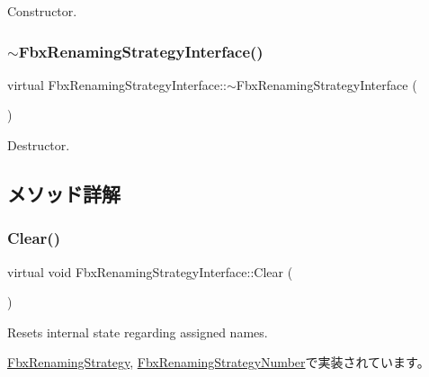 Constructor. 

\mbox{\label{class_fbx_renaming_strategy_interface_ab52664f630e238593eeba2bb204cebbe}} 
\subsubsection{\texorpdfstring{$\sim$\+Fbx\+Renaming\+Strategy\+Interface()}{~FbxRenamingStrategyInterface()}}
{\footnotesize\ttfamily virtual Fbx\+Renaming\+Strategy\+Interface\+::$\sim$\+Fbx\+Renaming\+Strategy\+Interface (\begin{DoxyParamCaption}{ }\end{DoxyParamCaption})\hspace{0.3cm}{\ttfamily [virtual]}}



Destructor. 



\subsection{メソッド詳解}
\mbox{\label{class_fbx_renaming_strategy_interface_a2090b5ae43936b617ec5d75015923f69}} 
\subsubsection{\texorpdfstring{Clear()}{Clear()}}
{\footnotesize\ttfamily virtual void Fbx\+Renaming\+Strategy\+Interface\+::\+Clear (\begin{DoxyParamCaption}{ }\end{DoxyParamCaption})\hspace{0.3cm}{\ttfamily [pure virtual]}}



Resets internal state regarding assigned names. 



\hyperlink{class_fbx_renaming_strategy_a87b1e89413d7b8c86a9d8a9f6fa6490f}{Fbx\+Renaming\+Strategy}, \hyperlink{class_fbx_renaming_strategy_number_aaf762d4d2ab243e6868b5d77a3ed8040}{Fbx\+Renaming\+Strategy\+Number}で実装されています。

